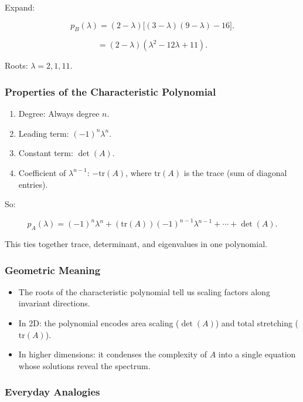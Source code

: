 \documentclass[
  letterpaper,
  DIV=11,
  numbers=noendperiod]{scrreprt}
\providecommand{\tightlist}{%
  \setlength{\itemsep}{0pt}\setlength{\parskip}{0pt}}
\begin{document}
Expand:

\[
p_B(\lambda) = (2-\lambda)\big[(3-\lambda)(9-\lambda) - 16\big].
\]

\[
= (2-\lambda)(\lambda^2 - 12\lambda + 11).
\]

Roots: \(\lambda = 2, 1, 11\).

\subsubsection{Properties of the Characteristic
Polynomial}\label{properties-of-the-characteristic-polynomial}

\begin{enumerate}
\def\labelenumi{\arabic{enumi}.}
\tightlist
\item
  Degree: Always degree \(n\).
\item
  Leading term: \((-1)^n \lambda^n\).
\item
  Constant term: \(\det(A)\).
\item
  Coefficient of \(\lambda^{n-1}\): \(-\text{tr}(A)\), where
  \(\text{tr}(A)\) is the trace (sum of diagonal entries).
\end{enumerate}

So:

\[
p_A(\lambda) = (-1)^n \lambda^n + (\text{tr}(A))(-1)^{n-1}\lambda^{n-1} + \cdots + \det(A).
\]

This ties together trace, determinant, and eigenvalues in one
polynomial.

\subsubsection{Geometric Meaning}\label{geometric-meaning-10}

\begin{itemize}
\tightlist
\item
  The roots of the characteristic polynomial tell us scaling factors
  along invariant directions.
\item
  In 2D: the polynomial encodes area scaling (\(\det(A)\)) and total
  stretching (\(\text{tr}(A)\)).
\item
  In higher dimensions: it condenses the complexity of \(A\) into a
  single equation whose solutions reveal the spectrum.
\end{itemize}

\subsubsection{Everyday Analogies}\label{everyday-analogies-58}
\end{document}

